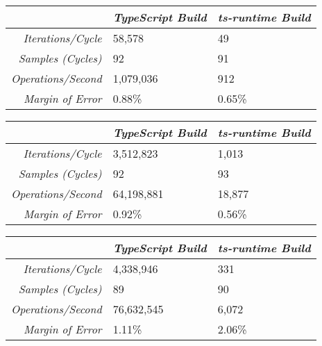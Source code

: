 \begin{center}
{
\centering
\tabulinesep=1.2mm
\setlength{\tabcolsep}{5mm}
\def\arraystretch{1.25}
\small
\begin{tabu} to \textwidth {|r||X[c,m]|X[c,m]|}
  \hline
  & \emph{TypeScript Build} & \emph{ts-runtime Build} \\
  \hline
  \hline
  \emph{Iterations/Cycle}  & 58,578 & 49 \\
  \hline
  \emph{Samples (Cycles)}  & 92 & 91 \\
  \hline
  \emph{Operations/Second} & 1,079,036 & 912 \\
  \hline
  \emph{Margin of Error}   & 0.88\% & 0.65\% \\
  \hline
\end{tabu}
}
\end{center}

\begin{center}
{
\centering
\tabulinesep=1.2mm
\setlength{\tabcolsep}{5mm}
\def\arraystretch{1.25}
\small
\begin{tabu} to \textwidth {|r||X[c,m]|X[c,m]|}
  \hline
  & \emph{TypeScript Build} & \emph{ts-runtime Build} \\
  \hline
  \hline
  \emph{Iterations/Cycle}  & 3,512,823 & 1,013 \\
  \hline
  \emph{Samples (Cycles)}  & 92 & 93 \\
  \hline
  \emph{Operations/Second} & 64,198,881 & 18,877 \\
  \hline
  \emph{Margin of Error}   & 0.92\% & 0.56\% \\
  \hline
\end{tabu}
}
\end{center}

\begin{center}
{
\centering
\tabulinesep=1.2mm
\setlength{\tabcolsep}{5mm}
\def\arraystretch{1.25}
\small
\begin{tabu} to \textwidth {|r||X[c,m]|X[c,m]|}
  \hline
  & \emph{TypeScript Build} & \emph{ts-runtime Build} \\
  \hline
  \hline
  \emph{Iterations/Cycle}  & 4,338,946 & 331 \\
  \hline
  \emph{Samples (Cycles)}  & 89 & 90 \\
  \hline
  \emph{Operations/Second} & 76,632,545 & 6,072 \\
  \hline
  \emph{Margin of Error}   & 1.11\% & 2.06\% \\
  \hline
\end{tabu}
}
\end{center}

